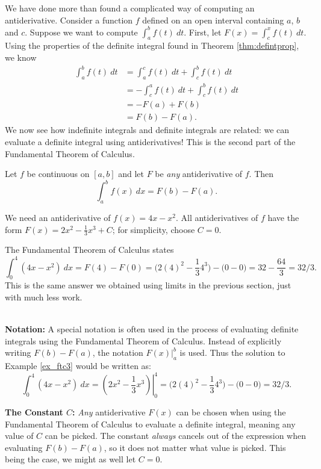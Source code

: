 We have done more than found a complicated way of computing an antiderivative. Consider a function $f$ defined on an open interval containing $a$, $b$ and $c$. Suppose we want to compute $\int_a^b f(t)\ dt$. First, let $F(x) = \int_c^x f(t)\ dt$. Using the properties of the definite integral found in Theorem \ref{thm:defintprop}, we know 
		\begin{align*}\int_a^b f(t)\ dt &= \int_a^c f(t)\ dt + \int_c^b f(t)\ dt \\
											&= -\int_c^a f(t)\ dt + \int_c^b f(t)\ dt \\
											&=-F(a) + F(b)\\
											&= F(b) - F(a).
		\end{align*}
We now see how indefinite integrals and definite integrals are related: we can evaluate a definite integral using antiderivatives! This is the second part of the Fundamental Theorem of Calculus.

{Let $f$ be continuous on $[a,b]$ and let $F$ be \textit{any} antiderivative of $f$. Then $$\int_a^b f(x)\ dx = F(b) - F(a).$$
}

{We need an antiderivative of $f(x)=4x-x^2$. All antiderivatives of $f$ have the form $F(x) = 2x^2-\frac13x^3+C$; for simplicity, choose $C=0$.

The Fundamental Theorem of Calculus states 
		$$\int_0^4(4x-x^2)\ dx = F(4)-F(0) = \big(2(4)^2-\frac134^3\big)-\big(0-0\big) = 32-\frac{64}3 = 32/3.$$
This is the same answer we obtained using limits in the previous section, just with much less work.
}\\

\noindent\textbf{Notation:} A special notation is often used in the process of evaluating definite integrals using the Fundamental Theorem of Calculus. Instead of explicitly writing $F(b)-F(a)$, the notation $F(x)\Big|_a^b$ is used. Thus the solution to Example \ref{ex_ftc3} would be written as:
	$$\int_0^4(4x-x^2)\ dx = \left.\left(2x^2-\frac13x^3\right)\right|_0^4 = \big(2(4)^2-\frac134^3\big)-\big(0-0\big) =  32/3.$$

\noindent\textbf{The Constant $C$:} \textit{Any} antiderivative $F(x)$ can be chosen when using the Fundamental Theorem of Calculus to evaluate a definite integral, meaning any value of $C$ can be picked. The constant \textit{always} cancels out of the expression when evaluating $F(b)-F(a)$, so it does not matter what value is picked. This being the case, we might as well let $C=0$.\\

